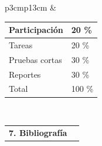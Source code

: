 \documentclass[letterpaper]{article}%
\begin{document}
\newline%
\begin{tabularx}{\textwidth}{p{3cm}p{13cm}}%
& \begin{minipage}{\linewidth}  \centering \vspace*{4mm}  \begin{tabular}{ p{4cm}  p{1.5cm} }  \toprule  Participación & 20 \% \\  \midrule  Tareas & 20 \% \\  \midrule  Pruebas cortas & 30 \% \\  \midrule  Reportes & 30 \% \\  \midrule Total & 100 \% \\  \bottomrule  \end{tabular} \end{minipage} \\%
\end{tabularx}%
\vspace*{4mm}%
\newline%
\begin{tabularx}{\textwidth}{p{3cm}p{13cm}}%
\par\fontsize{12}{14}\selectfont \textbf{\textcolor{parte}{7. Bibliografía}}&
\nocite{ida2020sensors}
\nocite{fraden2016sensors}
\nocite{pallas2012sensors}
\printbibliography[heading=none]\\%
\end{tabularx}%
\vspace*{4mm}%
\newline%
\end{document}
